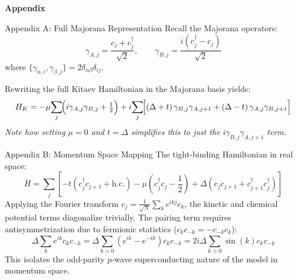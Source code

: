 \documentclass[aspectratio=169, 12pt]{beamer}
\newcommand{\cdag}{c^{\dagger}}
\newcommand{\gA}{\gamma_{A,j}}
\newcommand{\gB}{\gamma_{B,j}}
\begin{document}
\begin{frame}
  \centering
  \Huge \textbf{Appendix}
\end{frame}

\begin{frame}{Appendix A: Full Majorana Representation}
  Recall the Majorana operators:
  \begin{equation}
    \gamma_{A,j} = \frac{c_j + \cdag_j}{\sqrt{2}}, \qquad
    \gamma_{B,j} = \frac{i(\cdag_j - c_j)}{\sqrt{2}}
  \end{equation}
  where $\{\gamma_{\alpha,i}, \gamma_{\beta,j}\} = 2\delta_{\alpha\beta}\delta_{ij}$.

  \medskip
  Rewriting the full Kitaev Hamiltonian in the Majorana basis yields:
  \begin{equation}
    H_K = -\mu\!\sum_j \!\Bigl(i\gA\gB + \tfrac{1}{2}\Bigr)
          + i\!\sum_j \!\Bigl[
              (\Delta+t)\,\gamma_{B,j}\gamma_{A,j+1}
             +(\Delta-t)\,\gamma_{A,j}\gamma_{B,j+1}
            \Bigr]
  \end{equation}
  \emph{Note how setting $\mu=0$ and $t=\Delta$ simplifies this to just the $i\gamma_{B,j}\gamma_{A,j+1}$ term.}
\end{frame}

\begin{frame}{Appendix B: Momentum Space Mapping}
  The tight-binding Hamiltonian in real space:
  \begin{equation}
    H = \sum_{j} \left[ -t(c^\dagger_j c_{j+1} + \text{h.c.}) - \mu\left(c^\dagger_j c_j - \frac{1}{2}\right) + \Delta(c_j c_{j+1} + c^\dagger_{j+1} c^\dagger_j) \right]
  \end{equation}
  Applying the Fourier transform $c_j = \frac{1}{\sqrt{N}} \sum_{k} e^{ikj} c_k$, the kinetic and chemical potential terms diagonalize trivially. The pairing term requires antisymmetrization due to fermionic statistics ($c_k c_{-k} = -c_{-k} c_k$):
  \begin{equation}
    \Delta \sum_k e^{ik} c_k c_{-k} = \Delta \sum_{k>0} (e^{ik} - e^{-ik}) c_k c_{-k} = 2i\Delta \sum_{k>0} \sin(k) c_k c_{-k}
  \end{equation}
  This isolates the odd-parity $p$-wave superconducting nature of the model in momentum space.
\end{frame}
\end{document}
